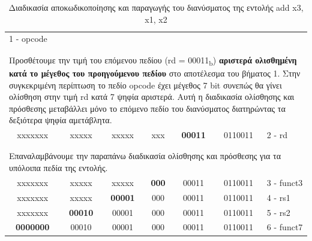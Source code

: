\documentclass[11pt]{extarticle}
\begin{document}
\begin{table}[H]
{\begin{tabular}{p{} p{} p{} p{} p{} p{} p{}}
\multicolumn{1}{l}{1 - opcode}\\\cline{1-6} \\
\hline\\
\multicolumn{7}{p{1.1\textwidth}}{
    Προσθέτουμε την τιμή του επόμενου πεδίου (rd = 00011\textsubscript{b}) \textbf{αριστερά ολισθημένη κατά το μέγεθος του προηγούμενου πεδίου} στο αποτέλεσμα του βήματος 1. 
    Στην συγκεκριμένη περίπτωση το πεδίο opcode έχει μέγεθος 7 bit συνεπώς θα γίνει ολίσθηση στην τιμή rd κατά 7 ψηφία αριστερά.
    Αυτή η διαδικασία ολίσθησης και πρόσθεσης μεταβάλλει μόνο το επόμενο πεδίο του διανύσματος διατηρώντας τα δεξιότερα ψηφία αμετάβλητα.
} \\\cline {1-6}
\multicolumn{1}{|c|}{xxxxxxx} &
\multicolumn{1}{c|}{xxxxx} &
\multicolumn{1}{c|}{xxxxx} &
\multicolumn{1}{c|}{xxx} &
\multicolumn{1}{c|}{\textbf{00011}} &
\multicolumn{1}{c|}{0110011} &
\multicolumn{1}{l}{2 - rd} \\\cline{1-6} \\
\hline\\
\multicolumn{7}{p{1.1\textwidth}}{
    Επαναλαμβάνουμε την παραπάνω διαδικασία ολίσθησης και πρόσθεσης για τα υπόλοιπα πεδία της εντολής.
} \\\cline {1-6}
\multicolumn{1}{|c|}{xxxxxxx} &
\multicolumn{1}{c|}{xxxxx} &
\multicolumn{1}{c|}{xxxxx} &
\multicolumn{1}{c|}{\textbf{000}} &
\multicolumn{1}{c|}{00011} &
\multicolumn{1}{c|}{0110011} &
\multicolumn{1}{l}{3 - funct3} \\\cline{1-6}
\multicolumn{1}{|c|}{xxxxxxx} &
\multicolumn{1}{c|}{xxxxx} &
\multicolumn{1}{c|}{\textbf{00001}} &
\multicolumn{1}{c|}{000} &
\multicolumn{1}{c|}{00011} &
\multicolumn{1}{c|}{0110011} &
\multicolumn{1}{l}{4 - rs1} \\\cline{1-6}
\multicolumn{1}{|c|}{xxxxxxx} &
\multicolumn{1}{c|}{\textbf{00010}} &
\multicolumn{1}{c|}{00001} &
\multicolumn{1}{c|}{000} &
\multicolumn{1}{c|}{00011} &
\multicolumn{1}{c|}{0110011} &
\multicolumn{1}{l}{5 - rs2} \\\cline{1-6}
\multicolumn{1}{|c|}{\textbf{0000000}} &
\multicolumn{1}{c|}{00010} &
\multicolumn{1}{c|}{00001} &
\multicolumn{1}{c|}{000} &
\multicolumn{1}{c|}{00011} &
\multicolumn{1}{c|}{0110011} &
\multicolumn{1}{l}{6 - funct7} \\\cline{1-6}
\end{tabular}
}
\caption[Παράδειγμα - Παραγωγή Διανύσματος add]{\label{tab:widgets}Διαδικασία αποκωδικοποίησης και παραγωγής του διανύσματος της εντολής add x3, x1, x2}
\end{table}
\end{document}
